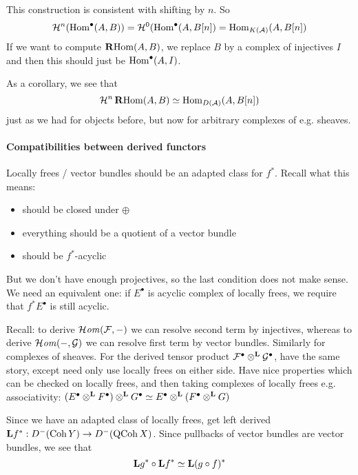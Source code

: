 This construction is consistent with shifting by $n$. So
\begin{equation*}
    \mathcal{H}^n(\operatorname{Hom}^\bullet(A,B))
        = \mathcal{H}^0(\operatorname{Hom}^\bullet(A,B[n])
        = \operatorname{Hom}_{K(\mathcal{A})}(A,B[n])
\end{equation*}
If we want to compute $\operatorname{\mathbf{R} Hom}(A,B)$, we replace $B$ by a complex of injectives $I$ and then this should just be $\operatorname{Hom}^\bullet(A,I)$.

As a corollary, we see that
\begin{equation*}
    \mathcal{H}^n\operatorname{\mathbf{R} Hom}(A,B) \simeq \operatorname{Hom}_{D(\mathcal{A})}(A,B[n])
\end{equation*}
just as we had for objects before, but now for arbitrary complexes of e.g. sheaves.

\paragraph{Compatibilities between derived functors}

Locally frees / vector bundles should be an adapted class for $f^*$. Recall what this means:
\begin{itemize}
    \item should be closed under $\oplus$
    \item everything should be a quotient of a vector bundle
    \item should be $f^*$-acyclic
\end{itemize}

But we don't have enough projectives, so the last condition does not make sense. We need an equivalent one: if $E^\bullet$ is acyclic complex of locally frees, we require that $f^*E^\bullet$ is still acyclic.

Recall: to derive $\operatorname{\mathcal{H}\mathit{om}}(\mathcal{F}, -)$ we can resolve second term by injectives, whereas to derive $\operatorname{\mathcal{H}\mathit{om}}(-,\mathcal{G})$ we can resolve first term by vector bundles. Similarly for complexes of sheaves. For the derived tensor product $\mathcal{F}^\bullet\otimes^{\mathbf{L}}\mathcal{G}^\bullet$, have the same story, except need only use locally frees on either side. Have nice properties which can be checked on locally frees, and then taking complexes of locally frees e.g. associativity: $(E^\bullet\otimes^{\mathbf{L}} F^\bullet)\otimes^{\mathbf{L}} G^\bullet \simeq E^\bullet\otimes^{\mathbf{L}}(F^\bullet\otimes^{\mathbf{L}} G)$

Since we have an adapted class of locally frees, get left derived $\mathbf{L} f^*:D^-(\operatorname{Coh} Y)\to D^-(\operatorname{QCoh} X)$. Since pullbacks of vector bundles are vector bundles, we see that
\begin{equation*}
    \mathbf{L} g^*\circ\mathbf{L} f^* \simeq \mathbf{L}(g\circ f)^*
\end{equation*}

